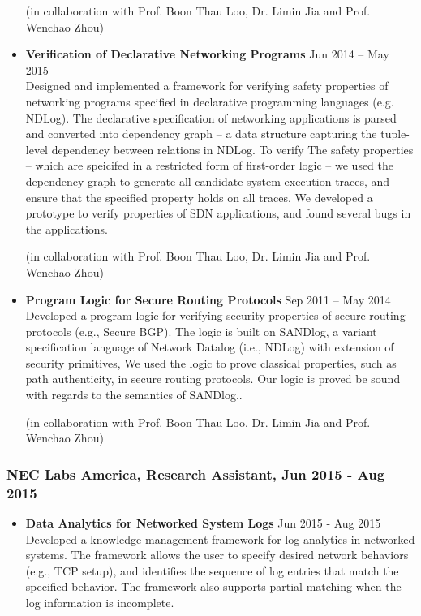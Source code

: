 \documentclass[10pt]{res} %
\begin{document}
\begin{resume}
\begin{itemize}
(in collaboration with Prof. Boon Thau Loo, Dr. Limin Jia and Prof. Wenchao Zhou)
\item {\bf Verification of Declarative Networking Programs} \hfill Jun
  2014 -- May 2015\\ Designed and implemented a framework for
  verifying safety properties of networking programs specified in
  declarative programming languages (e.g. NDLog). The declarative
  specification of networking applications is parsed and converted
  into dependency graph -- a data structure capturing the tuple-level
  dependency between relations in NDLog. To verify The safety
  properties -- which are speicifed in a restricted form of
  first-order logic -- we used the dependency graph to generate all
  candidate system execution traces, and ensure that the specified
  property holds on all traces. We developed a prototype to verify
  properties of SDN applications, and found several bugs in the
  applications.


(in collaboration with Prof. Boon Thau Loo, Dr. Limin Jia and Prof. Wenchao Zhou)
\item {\bf Program Logic for Secure Routing Protocols} \hfill Sep 2011
  -- May 2014\\ Developed a program logic for verifying security
  properties of secure routing protocols (e.g., Secure BGP). The logic
  is built on SANDlog, a variant specification language of Network
  Datalog (i.e., NDLog) with extension of security primitives, We used
  the logic to prove classical properties, such as path authenticity,
  in secure routing protocols. Our logic is proved be sound with
  regards to the semantics of SANDlog..


(in collaboration with Prof. Boon Thau Loo, Dr. Limin Jia and Prof. Wenchao Zhou)
\end{itemize}

\subsubsection{NEC Labs America, Research Assistant, Jun 2015 - Aug 2015}
\begin{itemize}
\item {\bf Data Analytics for Networked System Logs} \hfill Jun 2015 - Aug 2015\\
Developed a knowledge management framework for log analytics in networked
systems. The framework allows the user to specify desired network behaviors
(e.g., TCP setup), and identifies the sequence of log entries that match the
specified behavior. The framework also supports partial matching when the log
information is incomplete.


\end{itemize}
\end{resume}
\end{document}
